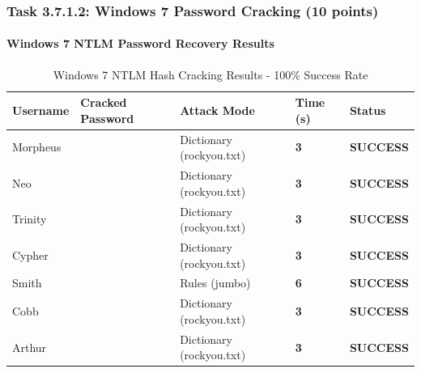 
\subsubsection{Task 3.7.1.2: Windows 7 Password Cracking (10 points)}


\paragraph{Windows 7 NTLM Password Recovery Results}

\begin{table}[H]
\centering
\label{tab:win7-passwords}
\caption{Windows 7 NTLM Hash Cracking Results - 100\% Success Rate}
\begin{tabularx}{\columnwidth}{@{}L{2.5cm}L{3.2cm}L{2.8cm}R{1.5cm}R{2.0cm}@{}}
\toprule
\textbf{Username} & \textbf{Cracked Password} & \textbf{Attack Mode} & \textbf{Time (s)} & \textbf{Status} \\
\midrule
{}
Morpheus & \textbf{} & Dictionary (rockyou.txt) & \textbf{3} & \textbf{SUCCESS} \\
Neo & \textbf{} & Dictionary (rockyou.txt) & \textbf{3} & \textbf{SUCCESS} \\
Trinity & \textbf{} & Dictionary (rockyou.txt) & \textbf{3} & \textbf{SUCCESS} \\
Cypher & \textbf{} & Dictionary (rockyou.txt) & \textbf{3} & \textbf{SUCCESS} \\
Smith & \textbf{} & Rules (jumbo) & \textbf{6} & \textbf{SUCCESS} \\
Cobb & \textbf{} & Dictionary (rockyou.txt) & \textbf{3} & \textbf{SUCCESS} \\
Arthur & \textbf{} & Dictionary (rockyou.txt) & \textbf{3} & \textbf{SUCCESS} \\
\bottomrule
\end{tabularx}
\end{table}

